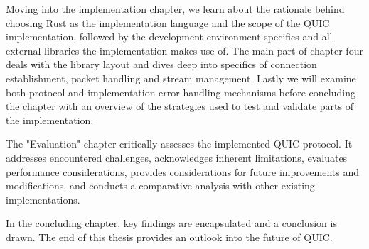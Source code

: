 Moving into the implementation chapter, we learn about the rationale behind choosing Rust as the implementation language and the scope of the QUIC implementation, followed by the development environment specifics and all external libraries the implementation makes use of. The main part of chapter four deals with the library layout and dives deep into specifics of connection establishment, packet handling and stream management. Lastly we will examine both protocol and implementation error handling mechanisms before concluding the chapter with an overview of the strategies used to test and validate parts of the implementation.

The "Evaluation" chapter critically assesses the implemented QUIC protocol. It addresses encountered challenges, acknowledges inherent limitations, evaluates performance considerations, provides considerations for future improvements and modifications, and conducts a comparative analysis with other existing implementations.

In the concluding chapter, key findings are encapsulated and a conclusion is drawn. The end of this thesis provides an outlook into the future of QUIC.